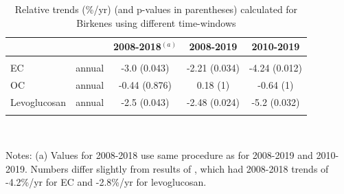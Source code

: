\begin{table}[H]
\centering
\parbox{11.9cm}{
\caption{Relative trends (\%/yr) (and p-values in parentheses) calculated for Birkenes 
    using different time-windows \label{tab:BirkenesTrends}}}
\begin{tabular}{lcccc}
\toprule
     &         & 2008-2018$^{(a)}$& 2008-2019     & 2010-2019       \\
\midrule
 & & & & \\
EC   & annual  & -3.0 (0.043)        &  -2.21 (0.034)   & -4.24 (0.012) \\
OC   & annual  &  -0.44 (0.876)      &   0.18 (1)     & -0.64 (1)   \\
Levoglucosan & annual  & -2.5 (0.043)        &  -2.48 (0.024)   & -5.2  (0.032) \\
& & & & \\
\bottomrule 
\end{tabular}\\
\parbox{11.9cm}{

Notes:
(a) Values for 2008-2018 use same procedure as for 2008-2019 and 2010-2019. Numbers
differ slightly from results of \citet{Yttri2021}, which had 2008-2018 trends of -4.2\%/yr for EC and -2.8\%/yr for levoglucosan.\\
\\
}
\end{table}


